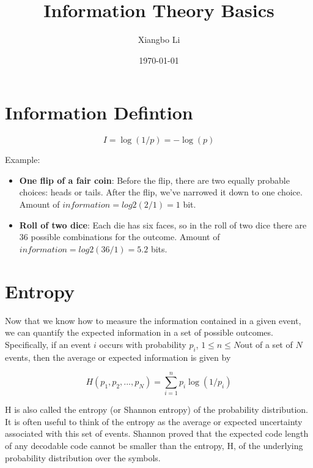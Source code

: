 \documentclass{article}
\title{Information Theory Basics}
\date{\today}
\author{Xiangbo Li}
\begin{document}
\maketitle

\section{Information Defintion}
\begin{equation}
	I = \log(1/p) = -\log(p)
\end{equation}

Example:
\begin{itemize}
	\item{\textbf{One flip of a fair coin}: Before the flip, there are two equally probable choices: heads or tails. After the flip,
	we’ve narrowed it down to one choice. Amount of $information = log2(2/1) = 1$ bit.}
	\item{\textbf{Roll of two dice}: Each die has six faces, so in the roll of two dice there are 36 possible combinations for
	the outcome. Amount of $information = log2(36/1) = 5.2$ bits.}
\end{itemize}

\section{Entropy}
Now that we know how to measure the information contained in a given event, we can quantify the expected information in a set of 
possible outcomes. Specifically, if an event $i$ occurs with probability $p_i$, $1 \leq n \leq N $out of a set of $N$ events, then the average or expected 
information is given by

\begin{equation}
	H(p_1, p_2, ..., p_N) = \sum_{i=1}^np_i\log(1/p_i)
\end{equation}

H is also called the entropy (or Shannon entropy) of the probability distribution.  
It is often useful to think of the entropy as the average or expected uncertainty associated with this set of events. Shannon proved that the expected
code length of any decodable code cannot be smaller than the entropy, H, of the underlying probability distribution over the symbols.
\end{document}
